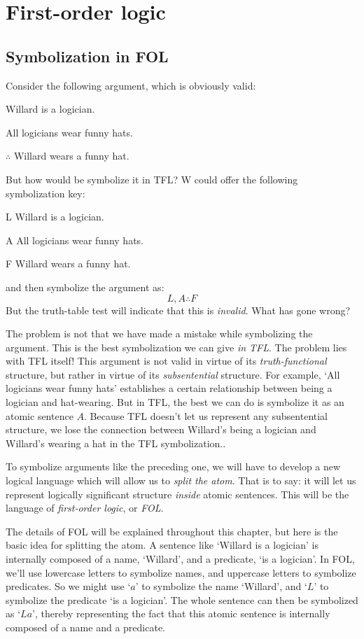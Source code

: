 \part{First-order logic}\label{p:FOL}

\chapter{Symbolization in FOL}\label{ch:FOLSymbolization}


Consider the following argument, which is obviously valid:
\begin{earg}
\item[] Willard is a logician.
\item[] All logicians wear funny hats.
\item[$\therefore$] Willard wears a funny hat.
\end{earg}
But how would be symbolize it in TFL? W could offer the following symbolization key:
\begin{ekey}
\item[L] Willard is a logician.
\item[A] All logicians wear funny hats.
\item[F] Willard wears a funny hat.
\end{ekey}
and then symbolize the argument as:
$$L, A \therefore F$$
But the truth-table test will indicate that this is \emph{invalid}. What has gone wrong?

The problem is not that we have made a mistake while symbolizing the argument. This is the best symbolization we can give \emph{in TFL}. The problem lies with TFL itself! This argument is not valid in virtue of its \emph{truth-functional} structure, but rather in virtue of its \emph{subsentential} structure.  For example, `All logicians wear funny hats' establishes a certain relationship between being a logician and hat-wearing. But in TFL, the best we can do is symbolize it as an atomic sentence $A$.  Because TFL doesn't let us represent any subsentential structure, we lose the connection between Willard's being a logician and Willard's wearing a hat in the TFL symbolization..

To symbolize arguments like the preceding one, we will have to develop a new logical language which will allow us to \emph{split the atom}.  That is to say: it will let us represent logically significant structure \emph{inside} atomic sentences. This will be the language of \emph{first-order logic}, or \emph{FOL}.

The details of FOL will be explained throughout this chapter, but here is the basic idea for splitting the atom.  A sentence like `Willard is a logician' is internally composed of a name, `Willard', and a predicate, `\blank is a logician'.  In FOL, we'll use lowercase letters to symbolize names, and uppercase letters to symbolize predicates.  So we might use `$a$' to symbolize the name `Willard', and `$L$' to symbolize the predicate `\blank is a logician'.  The whole sentence can then be symbolized as `$La$', thereby representing the fact that this atomic sentence is internally composed of a name and a predicate.

